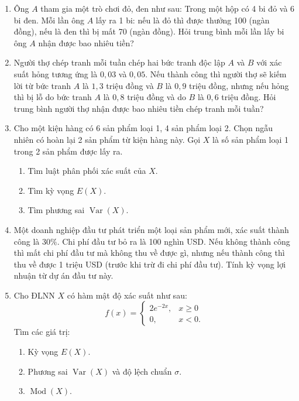 \begin{enumerate}[label=\textbf{\arabic*.}]
    \item Ông $A$ tham gia một trò chơi đỏ, đen như sau: Trong một hộp có 4 bi đỏ và 6 bi đen. Mỗi lần ông $A$ lấy ra 1 bi: nếu là đỏ thì được thưởng 100 (ngàn đồng), nếu là đen thì bị mất 70 (ngàn đồng). Hỏi trung bình mỗi lần lấy bi ông $A$ nhận được bao nhiêu tiền?

    \item Người thợ chép tranh mỗi tuần chép hai bức tranh độc lập $A$ và $B$ với xác suất hỏng tương ứng là $0{,}03$ và $0{,}05$. Nếu thành công thì người thợ sẽ kiếm lời từ bức tranh $A$ là $1{,}3$ triệu đồng và $B$ là $0{,}9$ triệu đồng, nhưng nếu hỏng thì bị lỗ do bức tranh $A$ là $0{,}8$ triệu đồng và do $B$ là $0{,}6$ triệu đồng. Hỏi trung bình người thợ nhận được bao nhiêu tiền chép tranh mỗi tuần?

    \item Cho một kiện hàng có 6 sản phẩm loại 1, 4 sản phẩm loại 2. Chọn ngẫu nhiên có hoàn lại 2 sản phẩm từ kiện hàng này. Gọi $X$ là số sản phẩm loại 1 trong 2 sản phẩm được lấy ra.
    \begin{enumerate}[label=\arabic*)]
        \item Tìm luật phân phối xác suất của $X$.
        \item Tìm kỳ vọng $E(X)$.
        \item Tìm phương sai $\operatorname{Var}(X)$.
    \end{enumerate}

    \item Một doanh nghiệp đầu tư phát triển một loại sản phẩm mới, xác suất thành công là $30\%$. Chi phí đầu tư bỏ ra là 100 nghìn USD. Nếu không thành công thì mất chi phí đầu tư mà không thu về được gì, nhưng nếu thành công thì thu về được 1 triệu USD (trước khi trừ đi chi phí đầu tư). Tính kỳ vọng lợi nhuận từ dự án đầu tư này.

    \item Cho ĐLNN $X$ có hàm mật độ xác suất như sau:
    \[
    f(x) = \begin{cases}
    2e^{-2x}, & x \ge 0 \\
    0, & x < 0.
    \end{cases}
    \]
    Tìm các giá trị:
    \begin{enumerate}[label=\arabic*)]
        \item Kỳ vọng $E(X)$.
        \item Phương sai $\operatorname{Var}(X)$ và độ lệch chuẩn $\sigma$.
        \item $\operatorname{Mod}(X)$.
    \end{enumerate}
\end{enumerate}
